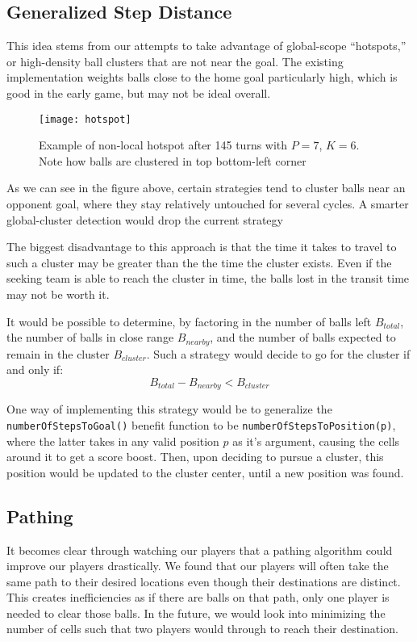 \documentclass[
10pt, %
letterpaper, %
oneside, %
headinclude,footinclude, %
english
]{article}
\begin{document}
\subsection{Generalized Step Distance}
This idea stems from our attempts to take advantage of global-scope “hotspots,” or high-density ball clusters that are not near the goal. The existing implementation weights balls close to the home goal particularly high, which is good in the early game, but may not be ideal overall. 

\begin{figure}[h]
\centering 
\texttt{[image: hotspot]} 
\caption[Example of non-local hotspot]{Example of non-local hotspot after 145 turns with $P=7$, $K=6$. Note how balls are clustered in top bottom-left corner}
\label{fig:gallery2} 
\end{figure}

As we can see in the figure above, certain strategies tend to cluster balls near an opponent goal, where they stay relatively untouched for several cycles. A smarter global-cluster detection would drop the current strategy 

The biggest disadvantage to this approach is that the time it takes to travel to such a cluster may be greater than the the time the cluster exists. Even if the seeking team is able to reach the cluster in time, the balls lost in the transit time may not be worth it.

It would be possible to determine, by factoring in the number of balls left $B_{total}$, the number of balls in close range $B_{nearby}$, and the number of balls expected to remain in the cluster $B_{cluster}$. Such a strategy would decide to go for the cluster if and only if: 
$$B_{total} - B_{nearby} < B_{cluster}$$

One way of implementing this strategy would be to generalize the  \texttt{numberOfStepsToGoal()} benefit function to be \texttt{numberOfStepsToPosition(p)}, where the latter takes in any valid position $p$ as it’s argument, causing the cells around it to get a score boost. Then, upon deciding to pursue a cluster, this position would be updated to the cluster center, until a new position was found.

\subsection{Pathing}
It becomes clear through watching our players that a pathing algorithm could improve our players drastically. We found that our players will often take the same path to their desired locations even though their destinations are distinct. This creates inefficiencies as if there are balls on that path, only one player is needed to clear those balls. In the future, we would look into minimizing the number of cells such that two players would through to reach their destination. 
\end{document}
